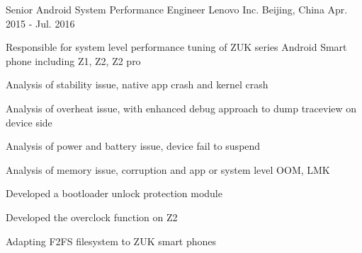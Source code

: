 

\begin{cventries}

  \cventry
    {Senior Android System Performance Engineer} %
    {Lenovo Inc.} %
    {Beijing, China} %
    {Apr. 2015 - Jul. 2016} %
    {
      \begin{cvitems} %
        \item {Responsible for system level performance tuning of ZUK series Android Smart phone including Z1, Z2, Z2 pro}
        \item {Analysis of stability issue, native app crash and kernel crash}
        \item {Analysis of overheat issue, with enhanced debug approach to dump traceview on device side}
        \item {Analysis of power and battery issue, device fail to suspend}
        \item {Analysis of memory issue, corruption and app or system level OOM, LMK}
        \item {Developed a bootloader unlock protection module}
        \item {Developed the overclock function on Z2}
        \item {Adapting F2FS filesystem to ZUK smart phones}
      \end{cvitems}
    }


\end{cventries}

